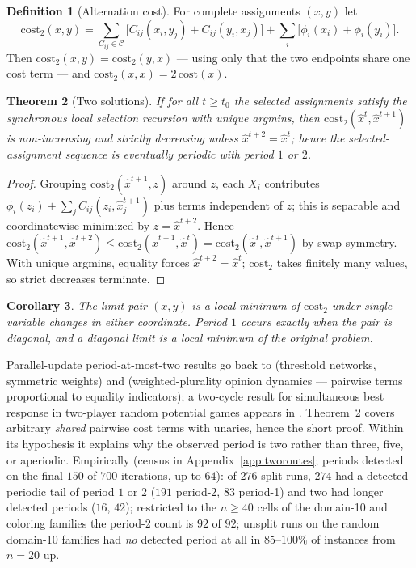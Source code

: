 \documentclass[letterpaper]{article} %
\newtheorem{theorem}{Theorem}[section]
\newtheorem{corollary}[theorem]{Corollary}
\theoremstyle{definition}
\newtheorem{definition}[theorem]{Definition}
\theoremstyle{remark}
\begin{document}
\begin{definition}[Alternation cost]\label{def:altcost}
For complete assignments $(x, y)$ let
\[
  \mathrm{cost}_2(x,y) = \!\!\sum_{C_{ij}\in\mathcal{C}}\!\!
  \big[C_{ij}(x_i, y_j) + C_{ij}(y_i, x_j)\big]
  + \sum_i \big[\phi_i(x_i) + \phi_i(y_i)\big].
\]
Then $\mathrm{cost}_2(x,y) = \mathrm{cost}_2(y,x)$ --- using only that
the two endpoints share one cost term --- and $\mathrm{cost}_2(x,x) =
2\,\mathrm{cost}(x)$.
\end{definition}

\begin{theorem}[Two solutions]\label{thm:tworoutes}
If for all $t \ge t_0$ the selected assignments satisfy the synchronous
local selection recursion with unique argmins, then
$\mathrm{cost}_2(\hat{x}^{t}, \hat{x}^{t+1})$ is non-increasing and
strictly decreasing unless $\hat{x}^{t+2} = \hat{x}^{t}$; hence the
selected-assignment sequence is eventually periodic with period $1$ or
$2$.
\end{theorem}
\begin{proof}
Grouping $\mathrm{cost}_2(\hat{x}^{t+1}, z)$ around $z$, each $X_i$
contributes $\phi_i(z_i) + \sum_{j} C_{ij}(z_i, \hat{x}^{t+1}_j)$ plus
terms independent of $z$; this is separable and coordinatewise minimized
by $z = \hat{x}^{t+2}$.  Hence
$\mathrm{cost}_2(\hat{x}^{t+1}, \hat{x}^{t+2}) \le
\mathrm{cost}_2(\hat{x}^{t+1}, \hat{x}^{t}) =
\mathrm{cost}_2(\hat{x}^{t}, \hat{x}^{t+1})$ by swap symmetry.  With
unique argmins, equality forces $\hat{x}^{t+2} = \hat{x}^{t}$;
$\mathrm{cost}_2$ takes finitely many values, so strict decreases
terminate. \qedhere
\end{proof}

\begin{corollary}\label{cor:localmin}
The limit pair $(x, y)$ is a local minimum of $\mathrm{cost}_2$ under
single-variable changes in either coordinate.  Period $1$ occurs exactly
when the pair is diagonal, and a diagonal limit is a local minimum of the
original problem.
\end{corollary}

Parallel-update period-at-most-two results go back to
\citet{GolesOlivos80} (threshold networks, symmetric weights) and
\citet{PoljakSura83} (weighted-plurality opinion dynamics --- pairwise
terms proportional to equality indicators); a two-cycle result for
simultaneous best response in two-player random potential games appears
in \citet{AshkenaziGolan25}.  Theorem~\ref{thm:tworoutes} covers
arbitrary \emph{shared} pairwise cost terms with unaries, hence the short
proof.  Within its hypothesis it explains why the observed period is two
rather than three, five, or aperiodic.  Empirically (census in
Appendix~\ref{app:tworoutes}; periods detected on the final $150$ of
$700$ iterations, up to $64$): of $276$ split runs, $274$ had a detected
periodic tail of period $1$ or $2$ ($191$ period-2, $83$ period-1) and
two had longer detected periods ($16$, $42$); restricted to the
$n \ge 40$ cells of the domain-10 and coloring families the period-2
count is $92$ of $92$; unsplit runs on the random domain-10 families had
\emph{no} detected period at all in $85$--$100\%$ of instances from
$n{=}20$ up.
\end{document}
